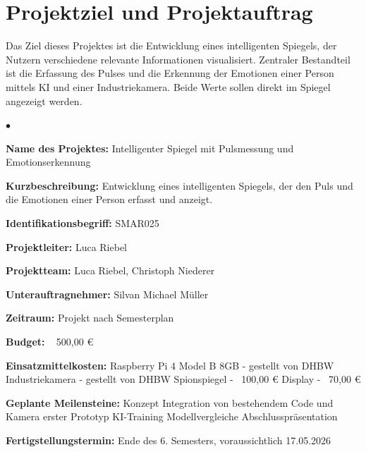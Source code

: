 
\chapter{Projektziel und Projektauftrag}
Das Ziel dieses Projektes ist die Entwicklung eines intelligenten Spiegels, der Nutzern verschiedene relevante Informationen visualisiert. Zentraler Bestandteil ist die Erfassung des Pulses und die Erkennung der Emotionen einer Person mittels KI und einer Industriekamera. Beide Werte sollen direkt im Spiegel angezeigt werden.

\begin{list}{$\bullet$}{\setlength{\itemsep}{5pt}}
    \item \textbf{Name des Projektes:} Intelligenter Spiegel mit Pulsmessung und Emotionserkennung
    \item \textbf{Kurzbeschreibung:} Entwicklung eines intelligenten Spiegels, der den Puls und die Emotionen einer Person erfasst und anzeigt.
    \item \textbf{Identifikationsbegriff:} SMAR025 
    \item \textbf{Projektleiter:} Luca Riebel
    \item \textbf{Projektteam:} Luca Riebel, Christoph Niederer
    \item \textbf{Unterauftragnehmer:} Silvan Michael Müller
    \item \textbf{Zeitraum:} Projekt nach Semesterplan
    \item \textbf{Budget:} ~ 500,00 €
    \item \textbf{Einsatzmittelkosten:}
    \subitem Raspberry Pi 4 Model B 8GB - gestellt von DHBW
    \subitem Industriekamera - gestellt von DHBW
    \subitem Spionspiegel - ~100,00 €
    \subitem Display - ~70,00 €
    \newpage
    \item \textbf{Geplante Meilensteine:} 
    \subitem Konzept
    \subitem Integration von bestehendem Code und Kamera
    \subitem erster Prototyp 
    \subitem KI-Training 
    \subitem Modellvergleiche
    \subitem Abschlusspräsentation
    \item \textbf{Fertigstellungstermin:} Ende des 6. Semesters, voraussichtlich 17.05.2026 

       
\end{list}
